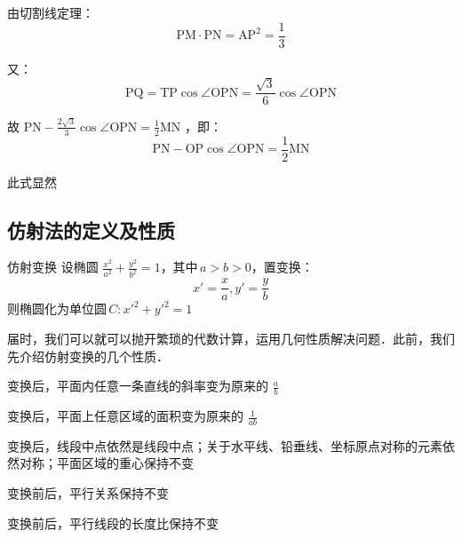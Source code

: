 由切割线定理：
$${\text{PM}}\cdot{\text{PN}}=\text{AP}^2=\frac{1}3$$

又：
$$\text{PQ}=\text{TP}\cos\angle\text{OPN}=\frac{\sqrt{3}}{6}\cos\angle\text{OPN}$$

故 $\displaystyle{\text{PN}-\frac{2\sqrt{3}}{3}\cos\angle\text{OPN}=\frac{1}{2}\text{MN}}$ ，即：
$$\text{PN}-\text{OP}\cos\angle\text{OPN}=\frac{1}{2}\text{MN}$$

此式显然
\subsection{仿射法的定义及性质}
\begin{definition}{仿射变换}
设椭圆 $\displaystyle{\frac{x^2}{a^2}+\frac{y^2}{b^2}=1}$，其中\,$\displaystyle{a>b>0}$，置变换：
$$x'=\frac{x}{a},y'=\frac{y}{b}$$
则椭圆化为单位圆\,$\displaystyle{C:x'^2+y'^2=1}$
\end{definition}
届时，我们可以就可以抛开繁琐的代数计算，运用几何性质解决问题．此前，我们先介绍仿射变换的几个性质．
\begin{lemma}{}
变换后，平面内任意一条直线的斜率变为原来的 $\displaystyle{\frac{a}{b}}$
\end{lemma}
\begin{lemma}{}
变换后，平面上任意区域的面积变为原来的 $\displaystyle{\frac1{ab}}$
\end{lemma}
\begin{lemma}{}
变换后，线段中点依然是线段中点；关于水平线、铅垂线、坐标原点对称的元素依然对称；平面区域的重心保持不变
\end{lemma}
\begin{lemma}{}
变换前后，平行关系保持不变
\end{lemma}
\begin{lemma}{}
变换前后，平行线段的长度比保持不变
\end{lemma}
